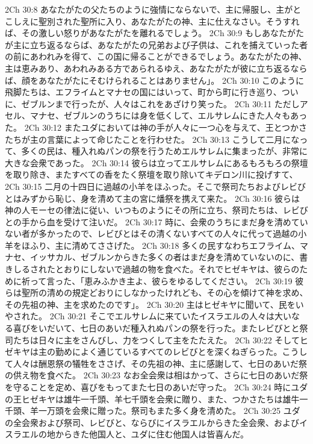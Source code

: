 2Ch 30:8  あなたがたの父たちのように強情にならないで、主に帰服し、主がとこしえに聖別された聖所に入り、あなたがたの神、主に仕えなさい。そうすれば、その激しい怒りがあなたがたを離れるでしょう。
2Ch 30:9  もしあなたがたが主に立ち返るならば、あなたがたの兄弟および子供は、これを捕えていった者の前にあわれみを得て、この国に帰ることができるでしょう。あなたがたの神、主は恵みあり、あわれみある方であられるゆえ、あなたがたが彼に立ち返るならば、顔をあなたがたにそむけられることはありません」。
2Ch 30:10  このように飛脚たちは、エフライムとマナセの国にはいって、町から町に行き巡り、ついに、ゼブルンまで行ったが、人々はこれをあざけり笑った。
2Ch 30:11  ただしアセル、マナセ、ゼブルンのうちには身を低くして、エルサレムにきた人々もあった。
2Ch 30:12  またユダにおいては神の手が人々に一つ心を与えて、王とつかさたちが主の言葉によって命じたことを行わせた。
2Ch 30:13  こうして二月になって、多くの民は、種入れぬパンの祭を行うためエルサレムに集まったが、非常に大きな会衆であった。
2Ch 30:14  彼らは立ってエルサレムにあるもろもろの祭壇を取り除き、またすべての香をたく祭壇を取り除いてキデロン川に投げすて、
2Ch 30:15  二月の十四日に過越の小羊をほふった。そこで祭司たちおよびレビびとはみずから恥じ、身を清めて主の宮に燔祭を携えて来た。
2Ch 30:16  彼らは神の人モーセの律法に従い、いつものようにその所に立ち、祭司たちは、レビびとの手から血を受けて注いだ。
2Ch 30:17  時に、会衆のうちにまだ身を清めていない者が多かったので、レビびとはその清くないすべての人々に代って過越の小羊をほふり、主に清めてささげた。
2Ch 30:18  多くの民すなわちエフライム、マナセ、イッサカル、ゼブルンからきた多くの者はまだ身を清めていないのに、書きしるされたとおりにしないで過越の物を食べた。それでヒゼキヤは、彼らのために祈って言った、「恵みふかき主よ、彼らをゆるしてください。
2Ch 30:19  彼らは聖所の清めの規定どおりにしなかったけれども、その心を傾けて神を求め、その先祖の神、主を求めたのです」。
2Ch 30:20  主はヒゼキヤに聞いて、民をいやされた。
2Ch 30:21  そこでエルサレムに来ていたイスラエルの人々は大いなる喜びをいだいて、七日のあいだ種入れぬパンの祭を行った。またレビびとと祭司たちは日々に主をさんびし、力をつくして主をたたえた。
2Ch 30:22  そしてヒゼキヤは主の勤めによく通じているすべてのレビびとを深くねぎらった。こうして人々は酬恩祭の犠牲をささげ、その先祖の神、主に感謝して、七日のあいだ祭の供え物を食べた。
2Ch 30:23  なお全会衆は相はかって、さらに七日のあいだ祭を守ることを定め、喜びをもってまた七日のあいだ守った。
2Ch 30:24  時にユダの王ヒゼキヤは雄牛一千頭、羊七千頭を会衆に贈り、また、つかさたちは雄牛一千頭、羊一万頭を会衆に贈った。祭司もまた多く身を清めた。
2Ch 30:25  ユダの全会衆および祭司、レビびと、ならびにイスラエルからきた全会衆、およびイスラエルの地からきた他国人と、ユダに住む他国人は皆喜んだ。
